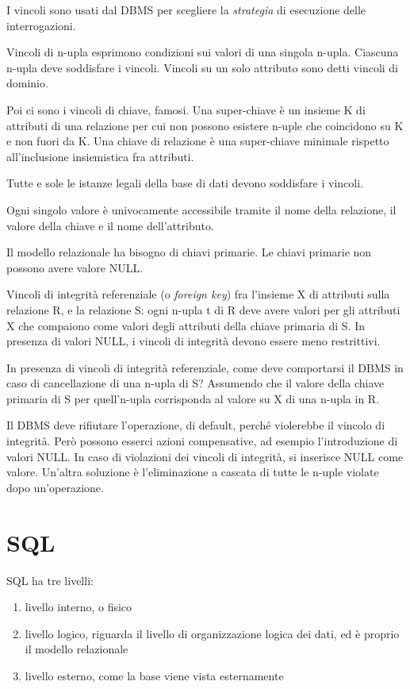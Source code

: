 I vincoli sono usati dal DBMS per scegliere la \emph{strategia} di esecuzione delle interrogazioni.

Vincoli di n-upla esprimono condizioni sui valori di una singola n-upla. Ciascuna n-upla deve soddisfare i vincoli. Vincoli su un solo attributo sono detti vincoli di dominio.

Poi ci sono i vincoli di chiave, famosi. Una super-chiave \`e un insieme K di attributi di una relazione per cui non possono esistere n-uple che coincidono su K e non fuori da K. Una chiave di relazione \`e una super-chiave minimale rispetto all'inclusione insiemistica fra attributi.

Tutte e sole le istanze legali della base di dati devono soddisfare i vincoli.

Ogni singolo valore \`e univocamente accessibile tramite il nome della relazione, il valore della chiave e il nome dell'attributo.

Il modello relazionale ha bisogno di chiavi primarie. Le chiavi primarie non possono avere valore NULL.

Vincoli di integrit\`a referenziale (o \emph{foreign key}) fra l'insieme X di attributi sulla relazione R, e la relazione S: ogni n-upla t di R deve avere valori per gli attributi X che compaiono come valori degli attributi della chiave primaria di S. In presenza di valori NULL, i vincoli di integrit\`a devono essere meno restrittivi.

In presenza di vincoli di integrit\`a referenziale, come deve comportarsi il DBMS in caso di cancellazione di una n-upla di S? Assumendo che il valore della chiave primaria di S per quell'n-upla corrisponda al valore su X di una n-upla in R.

Il DBMS deve rifiutare l'operazione, di default, perch\'e violerebbe il vincolo di integrit\`a. Per\`o possono esserci azioni compensative, ad esempio l'introduzione di valori NULL. In caso di violazioni dei vincoli di integrit\`a, si inserisce NULL come valore. Un'altra soluzione \`e l'eliminazione a cascata di tutte le n-uple violate dopo un'operazione.

\section{SQL}

SQL ha tre livelli:
\begin{enumerate}
    \item livello interno, o fisico
    \item livello logico, riguarda il livello di organizzazione logica dei dati, ed \`e proprio il modello relazionale
    \item livello esterno, come la base viene vista esternamente
\end{enumerate}


